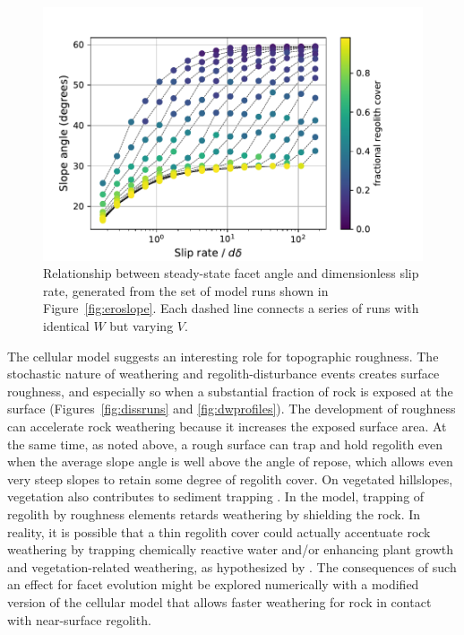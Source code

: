 \begin{figure}[ht!]
\centerline{\includegraphics{figure15.pdf}}
\caption{Relationship between steady-state facet angle and dimensionless slip rate, generated from the set of model runs shown in Figure~\ref{fig:eroslope}. Each dashed line connects a series of runs with identical $W$ but varying $V$.}
\label{fig:slopeslip}
\end{figure}

The cellular model suggests an interesting role for topographic roughness. The stochastic nature of weathering and regolith-disturbance events creates surface roughness, and especially so when a substantial fraction of rock is exposed at the surface (Figures~\ref{fig:dissruns} and \ref{fig:dwprofiles}). The development of roughness can accelerate rock weathering because it increases the exposed surface area. At the same time, as noted above, a rough surface can trap and hold regolith even when the average slope angle is well above the angle of repose, which allows even very steep slopes to retain some degree of regolith cover. On vegetated hillslopes, vegetation also contributes to sediment trapping \citep{dibiase2013vegetation,doane2018nonlocal}. In the model, trapping of regolith by roughness elements retards weathering by shielding the rock. In reality, it is possible that a thin regolith cover could actually accentuate rock weathering by trapping chemically reactive water and/or enhancing plant growth and vegetation-related weathering, as hypothesized by \citet{gilbert1877report}. The consequences of such an effect for facet evolution might be explored numerically with a modified version of the cellular model that allows faster weathering for rock in contact with near-surface regolith.

